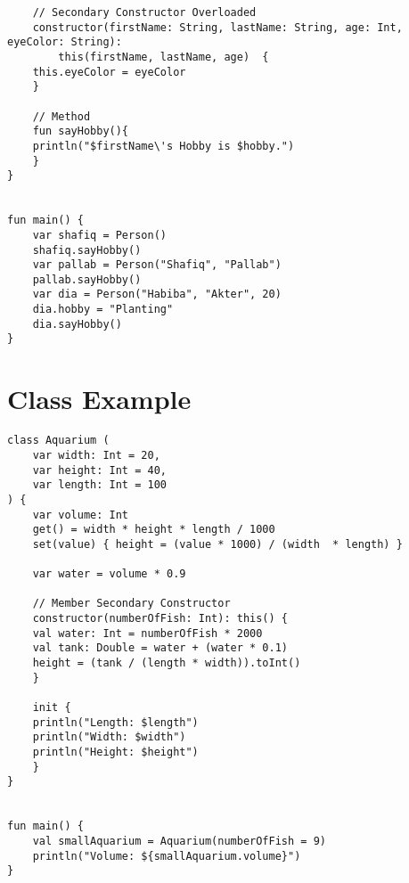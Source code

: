 \documentclass[11pt]{article}
\begin{document}
\begin{itemize}
\begin{verbatim}
    // Secondary Constructor Overloaded
    constructor(firstName: String, lastName: String, age: Int, eyeColor: String): 
	    this(firstName, lastName, age)  {
	this.eyeColor = eyeColor
    }

    // Method
    fun sayHobby(){
	println("$firstName\'s Hobby is $hobby.")
    }
}


fun main() {
    var shafiq = Person()
    shafiq.sayHobby()
    var pallab = Person("Shafiq", "Pallab")
    pallab.sayHobby()
    var dia = Person("Habiba", "Akter", 20)
    dia.hobby = "Planting"
    dia.sayHobby()
}
\end{verbatim}
\end{itemize}
\section*{Class Example}
\label{sec:orge00b1ed}
\begin{verbatim}
class Aquarium (
    var width: Int = 20,
    var height: Int = 40,
    var length: Int = 100
) {
    var volume: Int 
	get() = width * height * length / 1000
	set(value) { height = (value * 1000) / (width  * length) }

    var water = volume * 0.9

    // Member Secondary Constructor
    constructor(numberOfFish: Int): this() {
	val water: Int = numberOfFish * 2000
	val tank: Double = water + (water * 0.1)
	height = (tank / (length * width)).toInt()
    }

    init {
	println("Length: $length")
	println("Width: $width")
	println("Height: $height")
    }
}


fun main() {
    val smallAquarium = Aquarium(numberOfFish = 9)
    println("Volume: ${smallAquarium.volume}")
}
\end{verbatim}
\end{document}
